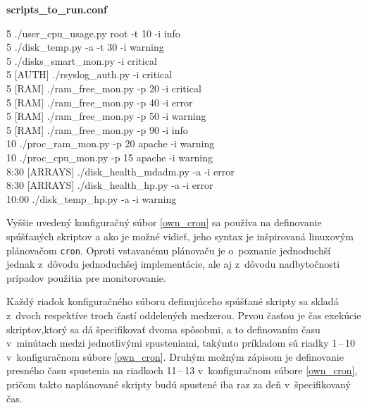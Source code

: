 \begin{center}
\begin{algorithm}[H]
	\caption{\bf{scripts\_to\_run.conf}\label{own_cron}}
	5 ./user\_cpu\_usage.py root -t 10 -i info\\
	5 ./disk\_temp.py -a -t 30 -i warning\\
	5 ./disks\_smart\_mon.py -i critical\\
	
	5 [AUTH] ./rsyslog\_auth.py -i critical\\
	
	5 [RAM] ./ram\_free\_mon.py -p 20 -i critical\\
	5 [RAM] ./ram\_free\_mon.py -p 40 -i error\\
	5 [RAM] ./ram\_free\_mon.py -p 50 -i warning\\
	5 [RAM] ./ram\_free\_mon.py -p 90 -i info \\
	
	10 ./proc\_ram\_mon.py -p 20 apache -i warning\\
	10 ./proc\_cpu\_mon.py -p 15 apache -i warning\\
	
	8:30 [ARRAYS] ./disk\_health\_mdadm.py -a -i error\\
	8:30 [ARRAYS] ./disk\_health\_hp.py -a -i error\\
	10:00 ./disk\_temp\_hp.py -a -i warning\\
\end{algorithm}
\end{center}

Vyššie uvedený konfiguračný súbor \ref{own_cron} sa používa na definovanie spúšťaných skriptov a ako je možné vidieť, jeho syntax je inšpirovaná linuxovým plánovačom \texttt{cron}. Oproti vstavanému plánovaču je o~poznanie jednoduchší jednak z~dôvodu jednoduchšej implementácie, ale aj z~dôvodu nadbytočnosti prípadov použitia pre monitorovanie.

Každý riadok konfiguračného súboru definujúceho spúšťané skripty sa skladá z~dvoch respektíve troch častí oddelených medzerou. 
Prvou časťou je čas exekúcie skriptov,ktorý sa dá špecifikovať dvoma spôsobmi, a to definovaním času v~minútach medzi jednotlivými spusteniami, takýmto príkladom sú riadky 1\,--\,10 v~konfiguračnom súbore \ref{own_cron}. Druhým možným zápisom je definovanie presného času spustenia na riadkoch 11\,--\,13 v~konfiguračnom súbore \ref{own_cron}, pričom takto naplánované skripty budú spustené iba raz za deň v~špecifikovaný čas.

